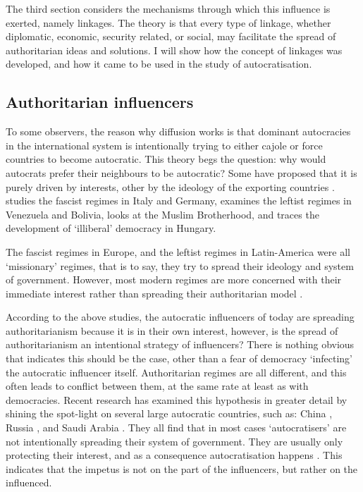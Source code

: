 The third section considers the mechanisms through which this influence is exerted, namely linkages. The theory is that every type of linkage, whether diplomatic, economic, security related, or social, may facilitate the spread of authoritarian ideas and solutions. I will show how the concept of linkages was developed, and how it came to be used in the study of autocratisation. 

\subsection{Authoritarian influencers}
To some observers, the reason why diffusion works is that dominant autocracies in the international system is intentionally trying to either cajole or force countries to become autocratic. This theory begs the question: why would autocrats prefer their neighbours to be autocratic? Some have proposed that it is purely driven by interests, other by the ideology of the exporting countries \citep{weyland_autocratic_2017}.  \citet{weyland_fascisms_2017} studies the fascist regimes in Italy and Germany, \citet{de_la_torre_hugo_2017} examines the leftist regimes in Venezuela and Bolivia, \citet{darwich_creating_2017} looks at the Muslim Brotherhood, and \citet{buzogany_illiberal_2017} traces the development of `illiberal' democracy in Hungary. 

The fascist regimes in Europe, and the leftist regimes in Latin-America were all `missionary' regimes, that is to say, they try to spread their ideology and system of government. However, most modern regimes are more concerned with their immediate interest rather than spreading their authoritarian model \citep{bank_study_2017, brownlee_limited_2017}. 

According to the above studies, the autocratic influencers of today are spreading authoritarianism because it is in their own interest, however, is the spread of authoritarianism an intentional strategy of influencers? There is nothing obvious that indicates this should be the case, other than a fear of democracy `infecting' the autocratic influencer itself. Authoritarian regimes are all different, and this often leads to conflict between them, at the same rate at least as with democracies. Recent research has examined this hypothesis in greater detail by shining the spot-light on several large autocratic countries, such as: China \citep{chen_democracy_2015, hackenesch_not_2015}, Russia \citep{babayan_return_2015, delcour_spoiler_2015}, and Saudi Arabia \citep{freyburg_local_2015, hassan_undermining_2015}.  They all find that in most cases `autocratisers' are not intentionally spreading their system of government. They are usually only protecting their interest, and as a consequence autocratisation happens \citep{risse_democracy_2015, borzel_noble_2015}. This indicates that the impetus is not on the part of the influencers, but rather on the influenced. 

